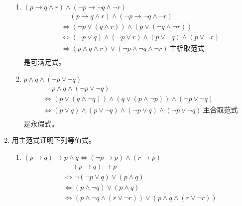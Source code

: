 \documentclass[UTF8]{ctexart}
\begin{document}
\begin{enumerate}
\begin{enumerate}
         \item $( p \rightarrow  q \wedge   r) \wedge   (\neg p \rightarrow  \neg q \wedge   \neg r)$
         \[
           \begin{aligned}
               &\mathrel{\phantom{=}}( p \rightarrow  q \wedge   r) \wedge   (\neg p \rightarrow  \neg q \wedge   \neg r)\\
               &\Leftrightarrow(\neg p \vee (q\wedge r))\wedge(p\vee (\neg q \wedge \neg r))\\
               &\Leftrightarrow (\neg p\vee q)\wedge(\neg p \vee r)\wedge (p\vee \neg q) \wedge (p\vee \neg r)\\
               &\Leftrightarrow(p \wedge q \wedge r)\vee (\neg p \wedge \neg q \wedge \neg r)\ \text{主析取范式}\\
           \end{aligned} 
         \]
         是可满足式。
         \item $p \wedge   q \wedge   (\neg p \vee  \neg q)$
         \[
           \begin{aligned}
               &\mathrel{\phantom{=}}p \wedge   q \wedge   (\neg p \vee  \neg q)\\
               &\Leftrightarrow (p\vee (q \wedge \neg q))\wedge (q \vee (p \wedge \neg p))\wedge (\neg p \vee \neg q)\\
               &\Leftrightarrow (p \vee q) \wedge (p \vee \neg q) \wedge (\neg p \vee q) \wedge (\neg p \vee \neg q)\ \text{主合取范式}\\
           \end{aligned} 
         \]
         是永假式。
      \end{enumerate}
      \item 用主范式证明下列等值式。
      \begin{enumerate}
         \item $( p \rightarrow  q) \rightarrow  p \wedge  q \Leftrightarrow  (\neg p \rightarrow  p) \wedge  (r \rightarrow  p)$
         \[
            \begin{aligned}
               &\mathrel{\phantom{=}}( p \rightarrow  q) \rightarrow  p\\
               &\Leftrightarrow \neg(\neg p \vee q)\vee (p \wedge q)\\
               &\Leftrightarrow (p\wedge \neg q)\vee(p\wedge q)\\
               &\Leftrightarrow (p \wedge \neg q \wedge (r \vee \neg r))\vee (p \wedge q \wedge (r\vee \neg r))\\

\end{aligned}\]
\end{enumerate}
\end{enumerate}
\end{document}
